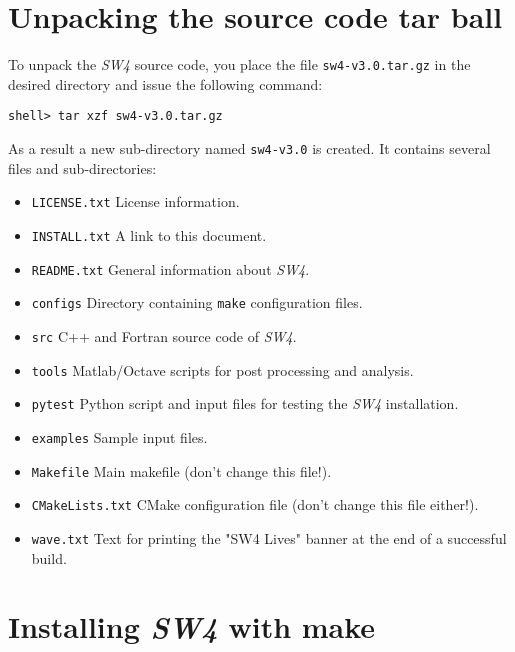\documentclass[11pt]{article}
\begin{document}
\section{Unpacking the source code tar ball}

To unpack the \emph{SW4} source code, you place the file \verb+sw4-v3.0.tar.gz+ in the
desired directory and issue the following command:
\begin{verbatim}
shell> tar xzf sw4-v3.0.tar.gz
\end{verbatim}
As a result a new sub-directory named \verb+sw4-v3.0+ is created. It contains several files
and sub-directories:
%
\begin{itemize}
\item \verb+LICENSE.txt+ License information.
\item \verb+INSTALL.txt+ A link to this document.
\item \verb+README.txt+ General information about \emph{SW4}.
\item \verb+configs+ Directory containing \verb+make+ configuration files.
\item \verb+src+ C++ and Fortran source code of \emph{SW4}.
\item \verb+tools+ Matlab/Octave scripts for post processing and analysis.
\item \verb+pytest+ Python script and input files for testing the \emph{SW4} installation.
\item \verb+examples+ Sample input files.
\item \verb+Makefile+ Main makefile (don't change this file!).
\item \verb+CMakeLists.txt+ CMake configuration file (don't change this file either!).
\item \verb+wave.txt+ Text for printing the "SW4 Lives" banner at the end of a successful build.
\end{itemize}

\section{Installing \emph{SW4} with make}\label{cha:installing-sw4}

\end{document}
